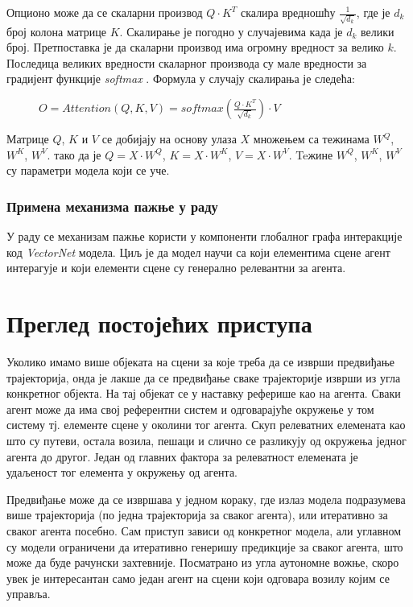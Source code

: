 \documentclass[11pt,oneside]{memoir}
\begin{document}
Опционо може да се скаларни производ $Q\cdot K^T$ скалира вредношћу $\frac{1}{\sqrt{d_k}}$, где је $d_k$ број колона матрице $K$. Скалирање је погодно
у случајевима када је $d_k$ велики број. Претпоставка је да скаларни производ има огромну вредност за велико $k$. Последица великих вредности 
скаларног производа су мале вредности за градијент функције \textit{softmax} \cite{attention_is_all_you_need}. Формула у случају скалирања је следећа:

\begin{figure}[H]
  \centering
  $O = Attention(Q, K, V) = softmax(\frac{Q\cdot K^T}{\sqrt{d_k}})\cdot V$
\end{figure}

Матрице $Q$, $K$ и $V$ се добијају на основу улаза $X$ множењем са тежинама $W^{Q}$, $W^{K}$, $W^{V}$. тако да је $Q = X\cdot W^{Q}$, $K = X\cdot W^{K}$,
$V = X\cdot W^{V}$. Teжине $W^{Q}$, $W^{K}$, $W^{V}$ су параметри модела који се уче.

\subsection{Примена механизма пажње у раду}

У раду се механизам пажње користи у компоненти глобалног графа интеракције код \textit{VectorNet} модела. Циљ је да модел научи
са који елементима сцене агент интерагује и који елементи сцене су генерално релевантни за агента. 

\chapter{Преглед постојећих приступа}
\label{chp:razrada}

Уколико имамо више објеката на сцени за које треба да се изврши предвиђање трајекторија, онда је лакше да се предвиђање сваке 
трајекторије изврши из угла конкретног објекта. На тај објекат се у наставку реферише као на агента.
Сваки агент може да има свој референтни систем
и одговарајуће окружење у том систему тј. елементе сцене у околини тог агента. Скуп релеватних елемената као што су путеви, остала возила, пешаци и слично се
разликују од окружења једног агента до другог. Један од главних фактора за релеватност елемената је удаљеност тог елемента у окружењу од агента.

Предвиђање може да се извршава у једном кораку, где излаз модела подразумева више трајекторија (по једна трајекторија за сваког агента), 
или итеративно за сваког агента посебно. Сам приступ зависи од конкретног модела, 
али углавном су модели ограничени да итеративно генеришу предикције за сваког агента, што може да буде рачунски захтевније. 
Посматрано из угла аутономне вожње, скоро увек је интересантан само један агент на сцени који одговара возилу којим се управља.
\end{document}
